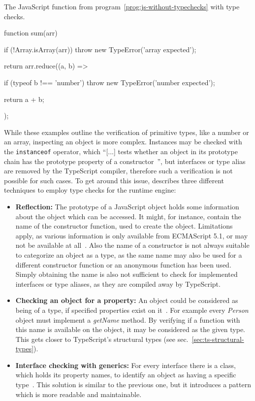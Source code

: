 \begin{program}
\caption{The JavaScript function from program~\ref{prog:js-without-typechecks} with type checks.}
\label{prog:js-with-typechecks}
\begin{JsCode}
function sum(arr) {
  if (!Array.isArray(arr)) {
    throw new TypeError('array expected');
  }
  
  return arr.reduce((a, b) => {
    if (typeof b !== 'number') {
      throw new TypeError('number expected');
    }
    
    return a + b;
  });
}
\end{JsCode}
\end{program}
While these examples outline the verification of primitive types, like a number or an array, inspecting an object is more complex. Instances may be checked with the \texttt{instanceof} operator, which ``[...] tests whether an object in its prototype chain has the prototype property of a constructor~\cite{instanceof:MDN:2017}'', but interfaces or type alias are removed by the TypeScript compiler, therefore such a verification is not possible for such cases. To get around this issue, \citeauthor{MasteringTypeScript:Rozentals:2015} describes three different techniques to employ type checks for the runtime engine:
\begin{itemize}
  \item \textbf{Reflection:} The prototype of a JavaScript object holds 
some information about the object which can be accessed. It might, for instance, contain the name of the constructor function, used to create the object. Limitations apply, as various
information is only available from ECMAScript 5.1, or may not be available at all~\cite[pp.~98--100]{MasteringTypeScript:Rozentals:2015}. Also the name of a constructor is not always suitable to categorize an object as a type, as the same name may also be used for a different constructor function or an anonymous function has been used. Simply obtaining the name is also not sufficient to check for implemented interfaces or type aliases, as they are compiled away by TypeScript.
  \item \textbf{Checking an object for a property:} An object could be considered 
as being of a type, if specified properties exist on it~\cites[pp.~101--102]{MasteringTypeScript:Rozentals:2015}[pp.~18--20]{ProJavaScriptDesignPatterns:HarmesDiaz:2008}. For example every \textit{Person} object must implement a \textit{getName} method. By verifying if a function with this name is available on the object, it may be considered as the given type. This gets closer to TypeScript's structural types (see sec.~\ref{sec:ts-structural-types}).
  \item \textbf{Interface checking with generics:} For every interface there is a 
class, which holds its property names, to identify an object as 
having a specific type~\cites[pp.~102-105]{MasteringTypeScript:Rozentals:2015}[pp.~17--19]{ProJavaScriptDesignPatterns:HarmesDiaz:2008}. This solution is similar to the previous one, but it introduces a pattern which is more readable and maintainable.
\end{itemize}
